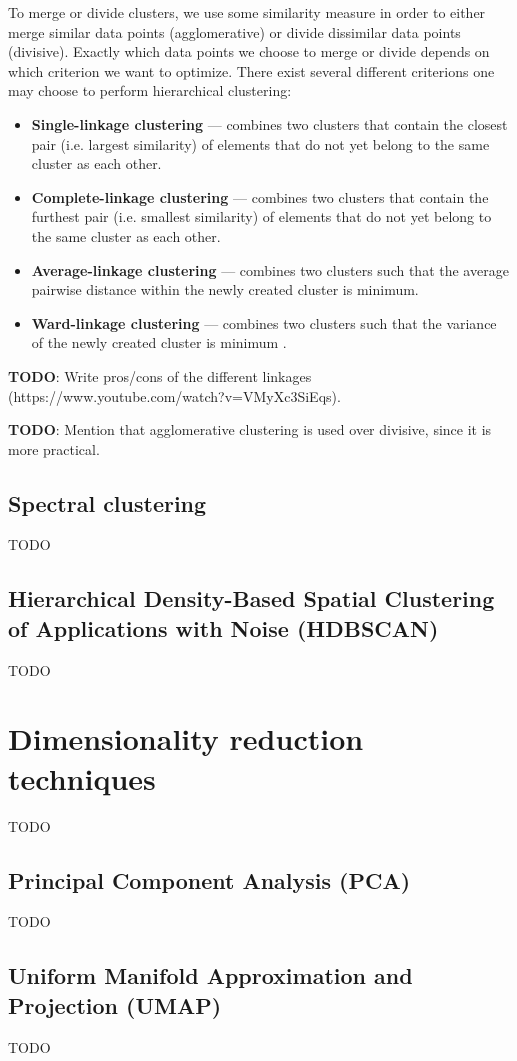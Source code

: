 To merge or divide clusters, we use some similarity measure in order to either merge similar data points (agglomerative) or divide dissimilar data points (divisive). Exactly which data points we choose to merge or divide depends on which criterion we want to optimize. There exist several different criterions one may choose to perform hierarchical clustering:
\begin{itemize}
    \item \textbf{Single-linkage clustering} --- combines two clusters that contain the closest pair (i.e. largest similarity) of elements that do not yet belong to the same cluster as each other.
    \item \textbf{Complete-linkage clustering}  --- combines two clusters that contain the furthest pair (i.e. smallest similarity) of elements that do not yet belong to the same cluster as each other.
    \item \textbf{Average-linkage clustering} --- combines two clusters such that the average pairwise distance within the newly created cluster is minimum.
    \item \textbf{Ward-linkage clustering} --- combines two clusters such that the variance of the newly created cluster is minimum \cite{Ward1963}.
\end{itemize}

\textbf{TODO}: Write pros/cons of the different linkages
(https://www.youtube.com/watch?v=VMyXc3SiEqs).

\textbf{TODO}: Mention that agglomerative clustering is used over divisive, since it is more practical.

\subsection{Spectral clustering}
TODO

\subsection{Hierarchical Density-Based Spatial Clustering of Applications with Noise (HDBSCAN)}
TODO

\section{Dimensionality reduction techniques}
TODO

\subsection{Principal Component Analysis (PCA)}
TODO

\subsection{Uniform Manifold Approximation and Projection (UMAP)}
TODO
